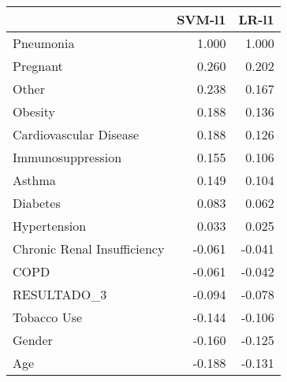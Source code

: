 \begin{tabular}{lrr}
\toprule
{} &  SVM-l1 &  LR-l1 \\
\midrule
Pneumonia                   &   1.000 &  1.000 \\
Pregnant                    &   0.260 &  0.202 \\
Other                       &   0.238 &  0.167 \\
Obesity                     &   0.188 &  0.136 \\
Cardiovascular Disease      &   0.188 &  0.126 \\
Immunosuppression           &   0.155 &  0.106 \\
Asthma                      &   0.149 &  0.104 \\
Diabetes                    &   0.083 &  0.062 \\
Hypertension                &   0.033 &  0.025 \\
Chronic Renal Insufficiency &  -0.061 & -0.041 \\
COPD                        &  -0.061 & -0.042 \\
RESULTADO\_3                 &  -0.094 & -0.078 \\
Tobacco Use                 &  -0.144 & -0.106 \\
Gender                      &  -0.160 & -0.125 \\
Age                         &  -0.188 & -0.131 \\
\bottomrule
\end{tabular}
